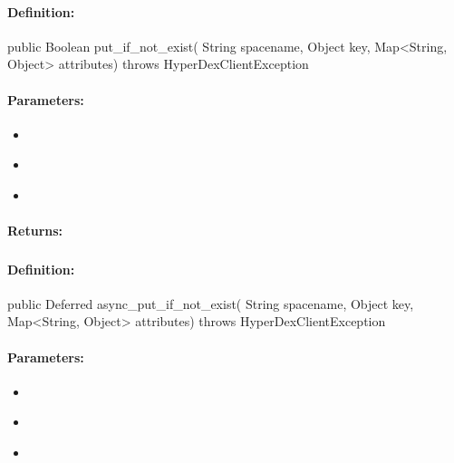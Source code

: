 \paragraph{Definition:}
\begin{javacode}
public Boolean put_if_not_exist(
        String spacename,
        Object key,
        Map<String, Object> attributes) throws HyperDexClientException
\end{javacode}

\paragraph{Parameters:}
\begin{itemize}[noitemsep]
\item {}\\

\item {}\\

\item {}\\

\end{itemize}

\paragraph{Returns:}


\pagebreak
\subsubsection{}
\label{api:java:async_put_if_not_exist}


\paragraph{Definition:}
\begin{javacode}
public Deferred async_put_if_not_exist(
        String spacename,
        Object key,
        Map<String, Object> attributes) throws HyperDexClientException
\end{javacode}

\paragraph{Parameters:}
\begin{itemize}[noitemsep]
\item {}\\

\item {}\\

\item {}\\

\end{itemize}

